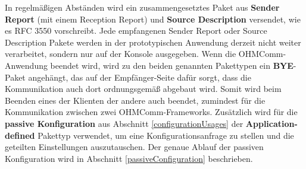 In regelmäßigen Abständen wird ein zusammengesetztes Paket aus \textbf{Sender Report} (mit einem Reception Report) und \textbf{Source Description} versendet, wie es RFC 3550 vorschreibt. Jede empfangenen Sender Report oder Source Description Pakete werden in der prototypischen Anwendung derzeit nicht weiter verarbeitet, sondern nur auf der Konsole ausgegeben. Wenn die OHMComm-Anwendung beendet wird, wird zu den beiden genannten Pakettypen ein \textbf{BYE}-Paket angehängt, das auf der Empfänger-Seite dafür sorgt, dass die Kommunikation auch dort ordnungsgemäß abgebaut wird. Somit wird beim Beenden eines der Klienten der andere auch beendet, zumindest für die Kommunikation zwischen zwei OHMComm-Frameworks. Zusätzlich wird für die \textbf{passive Konfiguration} aus Abschnitt \ref{configurationUsages} der \textbf{Application-defined} Pakettyp verwendet, um eine Konfigurationsanfrage zu stellen und die geteilten Einstellungen auszutauschen. Der genaue Ablauf der passiven Konfiguration wird in Abschnitt \ref{passiveConfiguration} beschrieben.

